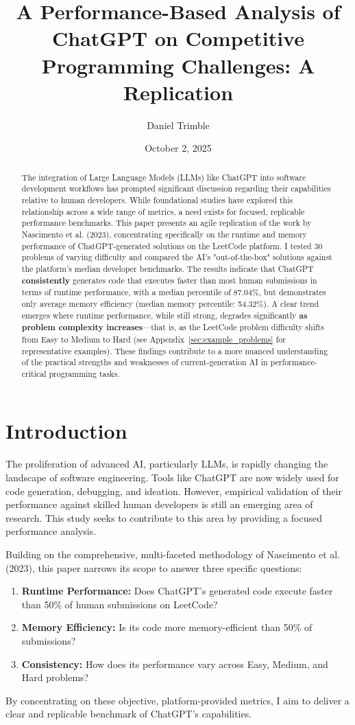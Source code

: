 \documentclass[12pt, a4paper]{article}
\title{A Performance-Based Analysis of ChatGPT on Competitive Programming Challenges: A Replication}
\author{Daniel Trimble}
\date{October 2, 2025}
\begin{document}
\maketitle

\begin{abstract}
The integration of Large Language Models (LLMs) like ChatGPT into software development workflows has prompted significant discussion regarding their capabilities relative to human developers. While foundational studies have explored this relationship across a wide range of metrics, a need exists for focused, replicable performance benchmarks. This paper presents an agile replication of the work by Nascimento et al. (2023), concentrating specifically on the runtime and memory performance of ChatGPT-generated solutions on the LeetCode platform. I tested 30 problems of varying difficulty and compared the AI's "out-of-the-box" solutions against the platform's median developer benchmarks. The results indicate that ChatGPT \textbf{consistently} generates code that executes faster than most human submissions in terms of runtime performance, with a median percentile of 87.04\%, but demonstrates only average memory efficiency (median memory percentile: 54.32\%). A clear trend emerges where runtime performance, while still strong, degrades significantly \textbf{as problem complexity increases}---that is, as the LeetCode problem difficulty shifts from Easy to Medium to Hard (see Appendix~\ref{sec:example_problems} for representative examples). These findings contribute to a more nuanced understanding of the practical strengths and weaknesses of current-generation AI in performance-critical programming tasks.
\end{abstract}

\section{Introduction}

The proliferation of advanced AI, particularly LLMs, is rapidly changing the landscape of software engineering. Tools like ChatGPT are now widely used for code generation, debugging, and ideation. However, empirical validation of their performance against skilled human developers is still an emerging area of research. This study seeks to contribute to this area by providing a focused performance analysis.

Building on the comprehensive, multi-faceted methodology of Nascimento et al. (2023), this paper narrows its scope to answer three specific questions:
\begin{enumerate}
    \item \textbf{Runtime Performance:} Does ChatGPT's generated code execute faster than 50\% of human submissions on LeetCode?
    \item \textbf{Memory Efficiency:} Is its code more memory-efficient than 50\% of submissions?
    \item \textbf{Consistency:} How does its performance vary across Easy, Medium, and Hard problems?
\end{enumerate}
By concentrating on these objective, platform-provided metrics, I aim to deliver a clear and replicable benchmark of ChatGPT's capabilities.
\end{document}
